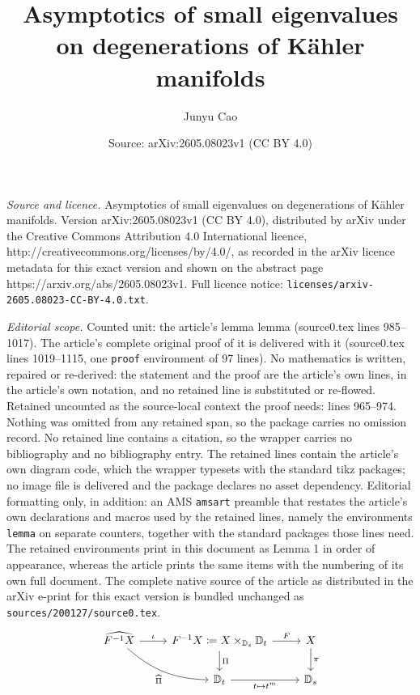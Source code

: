 \documentclass[10pt,a4paper]{amsart}
\title{Asymptotics of small eigenvalues on degenerations of K\"ahler manifolds}
\author{Junyu Cao}
\date{Source: arXiv:2605.08023v1 (CC BY 4.0)}
\newcommand{\D}{{\mathbb D}}
\begin{document}
\maketitle

\noindent\emph{Source and licence.} Asymptotics of small eigenvalues on degenerations of K\"ahler manifolds. Version arXiv:2605.08023v1 (CC BY 4.0), distributed by arXiv under the Creative Commons Attribution 4.0 International licence, http://creativecommons.org/licenses/by/4.0/, as recorded in the arXiv licence metadata for this exact version and shown on the abstract page https://arxiv.org/abs/2605.08023v1. Full licence notice: \texttt{licenses/arxiv-2605.08023-CC-BY-4.0.txt}.\par\smallskip

\noindent\textit{Editorial scope.} Counted unit: the article's lemma lemma (source0.tex lines 985--1017). The article's complete original proof of it is delivered with it (source0.tex lines 1019--1115, one \texttt{proof} environment of 97 lines). No mathematics is written, repaired or re-derived: the statement and the proof are the article's own lines, in the article's own notation, and no retained line is substituted or re-flowed.  Retained uncounted as the source-local context the proof needs: lines 965--974.  Nothing was omitted from any retained span, so the package carries no omission record.  No retained line contains a citation, so the wrapper carries no bibliography and no bibliography entry.  The retained lines contain the article's own diagram code, which the wrapper typesets with the standard tikz packages; no image file is delivered and the package declares no asset dependency.  Editorial formatting only, in addition: an AMS \texttt{amsart} preamble that restates the article's own declarations and macros used by the retained lines, namely the environments \texttt{lemma} on separate counters, together with the standard packages those lines need.  The retained environments print in this document as Lemma 1 in order of appearance, whereas the article prints the same items with the numbering of its own full document.  The complete native source of the article as distributed in the arXiv e-print for this exact version is bundled unchanged as \texttt{sources/200127/source0.tex}.
\begin{equation}
    \label{diagram:diagram-Z}
    \begin{tikzcd}
    \widehat{F^{-1}X} \arrow[r, "\iota"] \arrow[dr, bend right=20, "\widehat{\Pi}"']
    & F^{-1}X \coloneqq X \times_{\D_s} \D_t \arrow[r, "F"] \arrow[d, "\Pi"]
    & X \arrow[d, "\pi"] \\
    & \D_t \arrow[r, "t \mapsto t^m"']
    & \D_s
\end{tikzcd}
\end{equation}
\end{document}
